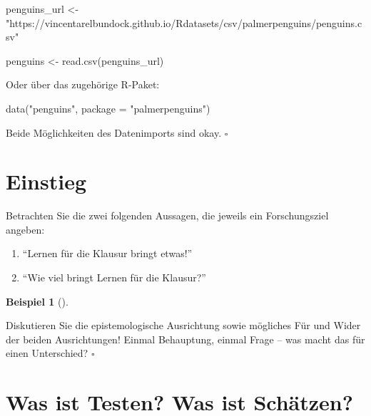 \documentclass[
  ngerman,
  letterpaper,
  twoside,
  open=any]{scrbook}
\newenvironment{Shaded}{\begin{snugshade}}{\end{snugshade}}
\newcommand{\AttributeTok}[1]{\textcolor[rgb]{0.40,0.45,0.13}{#1}}
\newcommand{\FunctionTok}[1]{\textcolor[rgb]{0.28,0.35,0.67}{#1}}
\newcommand{\NormalTok}[1]{\textcolor[rgb]{0.00,0.23,0.31}{#1}}
\newcommand{\OtherTok}[1]{\textcolor[rgb]{0.00,0.23,0.31}{#1}}
\newcommand{\StringTok}[1]{\textcolor[rgb]{0.13,0.47,0.30}{#1}}
\providecommand{\tightlist}{%
  \setlength{\itemsep}{0pt}\setlength{\parskip}{0pt}}\usepackage{longtable,booktabs,array}
\theoremstyle{definition}
\newtheorem{example}{Beispiel}[chapter]
\theoremstyle{plain}
\theoremstyle{definition}
\theoremstyle{definition}
\theoremstyle{definition}
\newtheorem{example}{Beispiel}[chapter]
\theoremstyle{definition}
\theoremstyle{remark}
\begin{document}
\begin{Shaded}
\begin{Highlighting}[]
\NormalTok{penguins\_url }\OtherTok{\textless{}{-}} \StringTok{"https://vincentarelbundock.github.io/Rdatasets/csv/palmerpenguins/penguins.csv"}

\NormalTok{penguins }\OtherTok{\textless{}{-}} \FunctionTok{read.csv}\NormalTok{(penguins\_url)}
\end{Highlighting}
\end{Shaded}

Oder über das zugehörige R-Paket:

\begin{Shaded}
\begin{Highlighting}[]
\FunctionTok{data}\NormalTok{(}\StringTok{"penguins"}\NormalTok{, }\AttributeTok{package =} \StringTok{"palmerpenguins"}\NormalTok{)}
\end{Highlighting}
\end{Shaded}

Beide Möglichkeiten des Datenimports sind okay. \(\square\)

\section{Einstieg}\label{einstieg-2}

Betrachten Sie die zwei folgenden Aussagen, die jeweils ein
Forschungsziel angeben:

\begin{enumerate}
\def\labelenumi{\arabic{enumi}.}
\tightlist
\item
  \enquote{Lernen für die Klausur bringt etwas!}
\item
  \enquote{Wie viel bringt Lernen für die Klausur?}
\end{enumerate}

\begin{example}[]\protect\hypertarget{exm-schaetzen-testen}{}\label{exm-schaetzen-testen}

Diskutieren Sie die epistemologische Ausrichtung sowie mögliches Für und
Wider der beiden Ausrichtungen! Einmal Behauptung, einmal Frage -- was
macht das für einen Unterschied? \(\square\)

\end{example}

\section{Was ist Testen? Was ist
Schätzen?}\label{was-ist-testen-was-ist-schuxe4tzen}
\end{document}
